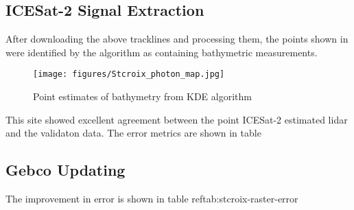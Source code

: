 \subsection{ICESat-2 Signal Extraction}
After downloading the above tracklines and processing them, the points shown in were identified by the algorithm as containing bathymetric measurements.

\begin{figure}[h]
    \centering
    \texttt{[image: figures/Stcroix\_photon\_map.jpg]}
    \caption{Point estimates of bathymetry from KDE algorithm }
    \label{fig:stcroix-bathy-points}
\end{figure}

This site showed excellent agreement between the point ICESat-2 estimated lidar and the validaton data. The error metrics are shown in table



\subsection{Gebco Updating}

The improvement in error is shown in table ref{tab:stcroix-raster-error}



